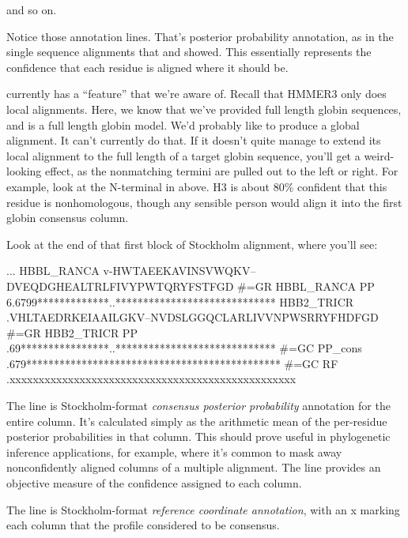 and so on. 

Notice those  annotation lines. That's posterior probability
annotation, as in the single sequence alignments that 
and  showed. This essentially represents the
confidence that each residue is aligned where it should be.

 currently has a ``feature'' that we're aware
of. Recall that HMMER3 only does local alignments. Here, we know that
we've provided full length globin sequences, and  is a
full length globin model. We'd probably like  to
produce a global alignment. It can't currently do that. If it doesn't
quite manage to extend its local alignment to the full length of a
target globin sequence, you'll get a weird-looking effect, as the
nonmatching termini are pulled out to the left or right. For example,
look at the N-terminal  in  above. H3 is
about 80\% confident that this residue is nonhomologous, though any
sensible person would align it into the first globin consensus column.

Look at the end of that first block of Stockholm alignment, where you'll
see:

\begin{sreoutput}
...
HBBL_RANCA         v-HWTAEEKAVINSVWQKV--DVEQDGHEALTRLFIVYPWTQRYFSTFGD
#=GR HBBL_RANCA PP 6.6799*************..*****************************
HBB2_TRICR         .VHLTAEDRKEIAAILGKV--NVDSLGGQCLARLIVVNPWSRRYFHDFGD
#=GR HBB2_TRICR PP .69****************..*****************************
#=GC PP_cons       .679**********************************************
#=GC RF            .xxxxxxxxxxxxxxxxxxxxxxxxxxxxxxxxxxxxxxxxxxxxxxxxx
\end{sreoutput}

The  line is Stockholm-format \emph{consensus
posterior probability} annotation for the entire column. It's
calculated simply as the arithmetic mean of the per-residue posterior
probabilities in that column. This should prove useful in phylogenetic
inference applications, for example, where it's common to mask away
nonconfidently aligned columns of a multiple alignment. The
 line provides an objective measure of the confidence
assigned to each column.

The  line is Stockholm-format \emph{reference
  coordinate annotation}, with an x marking each column that the
profile considered to be consensus.

